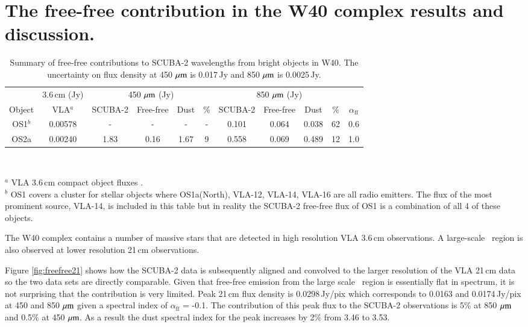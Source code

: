 \section{The free-free contribution in the W40 complex results and discussion.}

\begin{table}%
\caption{Summary of free-free contributions to SCUBA-2 wavelengths from bright objects in W40. The uncertainty on flux density at 450\,$\,\mu\rm{m}$ is 0.017\,Jy and 850\,$\,\mu\rm{m}$ is 0.0025\,Jy. }
\begin{tabular}{@{}|c|ccccccccc|c|}
       & 3.6\,cm (Jy)	& \multicolumn{4}{c}{450\,$\,\mu\rm{m}$ (Jy)} & \multicolumn{4}{c}{850\,$\,\mu\rm{m}$ (Jy)} \\
Object &	VLA$^{a}$	& SCUBA-2       & Free-free      & Dust      & \%      & SCUBA-2      & Free-free      & Dust       & \% 	& $\alpha_{\mathrm{ff}}$     \\
\hline
\hline
OS1$^{b}$   &	0.00578	& -             & -              & -         & -       & 0.101        & 0.064          & 0.038      & 62	&	0.6      \\
OS2a   &	0.00240	& 1.83          & 0.16           & 1.67      & 9      & 0.558        & 0.069          & 0.489      & 12	&	1.0     \\
\hline
\end{tabular}\\
\raggedright
$^{a}$ VLA 3.6\,cm compact object fluxes \citep{Rodriguez:2010bs}. \\
$^{b}$ OS1 covers a cluster for stellar objects where OS1a(North), VLA-12, VLA-14, VLA-16 are all radio emitters. The flux of the most prominent source, VLA-14, is included in this table but in reality the SCUBA-2 free-free flux of OS1 is a combination of all 4 of these objects. \\
\label{tab:freefree}
\end{table}

The W40 complex contains a number of massive stars that are detected in high resolution VLA 3.6\,cm observations. A large-scale \HII\ region is also observed at lower resolution 21\,cm observations. 

Figure \ref{fig:freefree21} shows how the SCUBA-2 data is subsequently aligned and convolved to the larger resolution of the VLA 21\,cm data so the two data sets are directly comparable. Given that free-free emission from the large scale \HII\ region is essentially flat in spectrum, it is not surprising that the contribution is very limited. Peak 21\,cm flux density is 0.0298\,Jy/pix which corresponds to 0.0163 and 0.0174\,Jy/pix at 450 and 850\,$\,\mu\rm{m}$ given a spectral index of 
$\alpha_{\mathrm{ff}}$ = -0.1. The contribution of this peak flux to the SCUBA-2 observations is 5\% at 850\,$\,\mu\rm{m}$ and 0.5\% at 450\,$\,\mu\rm{m}$. 
As a result the dust spectral index for the peak increases by 2\% from 3.46 to 3.53.

